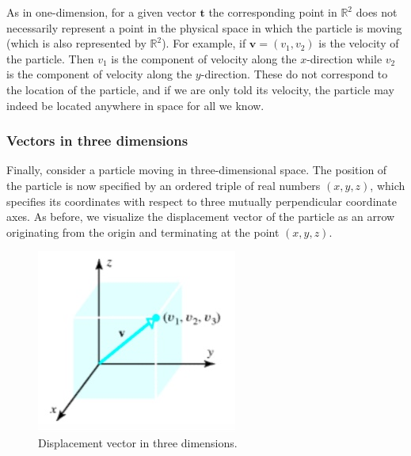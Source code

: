 \documentclass[12pt,letterpaper,reqno]{article}
\numberwithin{equation}{section}
\begin{document}
As in one-dimension, for a given vector $\mathbf{t}$ the corresponding point in $\mathbb{R}^2$ does not necessarily represent a point in the physical space in which the particle is moving (which is also represented by $\mathbb{R}^2$). For example, if $\mathbf{v}=(v_1,v_2)$ is the velocity of the particle. Then $v_1$ is the component of velocity along the $x$-direction while $v_2$ is the component of velocity along the $y$-direction. These do not correspond to the location of the particle, and if we are only told its velocity, the particle may indeed be located anywhere in space for all we know.

\subsubsection{Vectors in three dimensions}
Finally, consider a particle moving in three-dimensional space. The position of the particle is now specified by an ordered triple of real numbers $(x,y,z)$, which specifies its coordinates with respect to three mutually perpendicular coordinate axes. As before, we visualize the displacement vector of the particle as an arrow originating from the origin and terminating at the point $(x,y,z)$.

\begin{figure}[h]
	 \begin{center}
	\includegraphics[scale=0.6]{figures_mvc/components}
\end{center}
\caption{Displacement vector in three dimensions.}
\end{figure}
\end{document}
